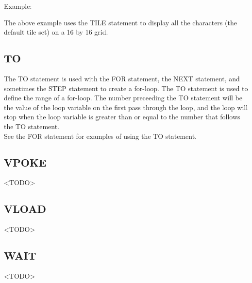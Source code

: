 Example:\\


The above example uses the {\ttfamily TILE} statement to display all the
characters (the default tile set) on a 16 by 16 grid.\\

\subsection{TO}

The {\ttfamily TO} statement is used with the {\ttfamily FOR} statement, the
{\ttfamily NEXT} statement, and sometimes the {\ttfamily STEP} statement to
create a for-loop.  The {\ttfamily TO} statement is used to define the range of
a for-loop.  The number preceeding the {\ttfamily TO} statement will be the
value of the loop variable on the first pass through the loop, and the loop
will stop when the loop variable is greater than or equal to the number that
follows the {\ttfamily TO} statement.\\

See the {\ttfamily FOR} statement for examples of using the {\ttfamily TO}
statement.\\

\subsection{VPOKE}

<TODO>

\subsection{VLOAD}

<TODO>

\subsection{WAIT}

<TODO>

